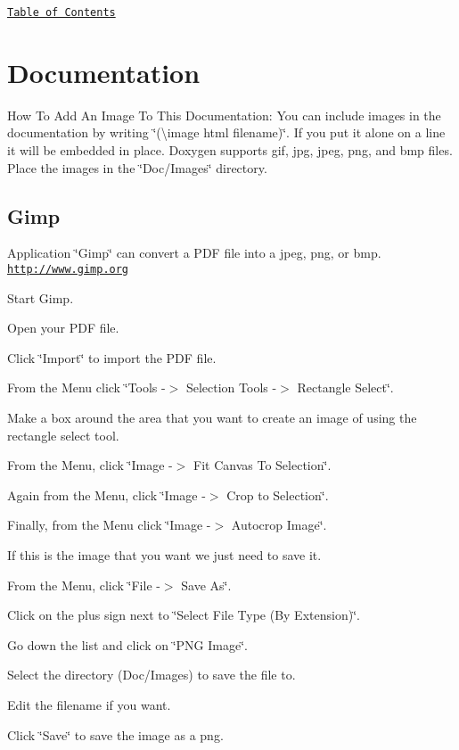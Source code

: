 \par
\href{#Contents}{\tt Table of Contents}\par
 



\label{_Documentation}%
\hypertarget{index_Docs}{}\section{Documentation}\label{index_Docs}
How To Add An Image To This Documentation\-: You can include images in the documentation by writing \char`\"{}(\textbackslash{}image html filename)\char`\"{}. If you put it alone on a line it will be embedded in place. Doxygen supports gif, jpg, jpeg, png, and bmp files. Place the images in the \char`\"{}\-Doc/\-Images\char`\"{} directory.\hypertarget{index_Gimp}{}\subsection{Gimp}\label{index_Gimp}
Application \char`\"{}\-Gimp\char`\"{} can convert a P\-D\-F file into a jpeg, png, or bmp. \href{http://www.gimp.org}{\tt http\-://www.\-gimp.\-org}


\begin{DoxyItemize}
\item Start Gimp.
\item Open your P\-D\-F file.
\item Click \char`\"{}\-Import\char`\"{} to import the P\-D\-F file.
\item From the Menu click \char`\"{}\-Tools -\/$>$ Selection Tools -\/$>$ Rectangle Select\char`\"{}.
\item Make a box around the area that you want to create an image of using the rectangle select tool.
\item From the Menu, click \char`\"{}\-Image -\/$>$ Fit Canvas To Selection\char`\"{}.
\item Again from the Menu, click \char`\"{}\-Image -\/$>$ Crop to Selection\char`\"{}.
\item Finally, from the Menu click \char`\"{}\-Image -\/$>$ Autocrop Image\char`\"{}.
\item If this is the image that you want we just need to save it.
\item From the Menu, click \char`\"{}\-File -\/$>$ Save As\char`\"{}.
\item Click on the plus sign next to \char`\"{}\-Select File Type (\-By Extension)\char`\"{}.
\item Go down the list and click on \char`\"{}\-P\-N\-G Image\char`\"{}.
\item Select the directory (Doc/\-Images) to save the file to.
\item Edit the filename if you want.
\item Click \char`\"{}\-Save\char`\"{} to save the image as a png.
\end{DoxyItemize}

